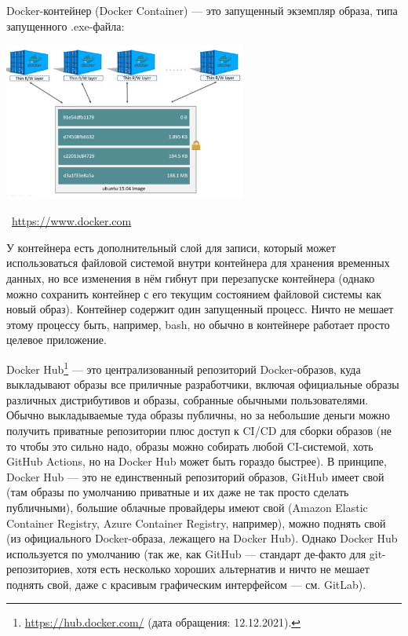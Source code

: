 \documentclass[a5paper]{article}
\newcommand{\attribution}[1] {
    \vspace{-5mm}\begin{flushright}\begin{scriptsize}\textcolor{gray}{\textcopyright\, #1}\end{scriptsize}\end{flushright}
}
\begin{document}
Docker-контейнер (Docker Container) --- это запущенный экземпляр образа, типа запущенного .exe-файла:

\begin{center}
    \includegraphics[width=0.6\textwidth]{dockerContainer.png}
    \attribution{\url{ https://www.docker.com}}
\end{center}

У контейнера есть дополнительный слой для записи, который может использоваться файловой системой внутри контейнера для хранения временных данных, но все изменения в нём гибнут при перезапуске контейнера (однако можно сохранить контейнер с его текущим состоянием файловой системы как новый образ). Контейнер содержит один запущенный процесс. Ничто не мешает этому процессу быть, например, bash, но обычно в контейнере работает просто целевое приложение.

Docker Hub\footnote{\url{https://hub.docker.com/} (дата обращения: 12.12.2021).} --- это централизованный репозиторий Docker-образов, куда выкладывают образы все приличные разработчики, включая официальные образы различных дистрибутивов и образы, собранные обычными пользователями. Обычно выкладываемые туда образы публичны, но за небольшие деньги можно получить приватные репозитории плюс доступ к CI/CD для сборки образов (не то чтобы это сильно надо, образы можно собирать любой CI-системой, хоть GitHub Actions, но на Docker Hub может быть гораздо быстрее). В принципе, Docker Hub --- это не единственный репозиторий образов, GitHub имеет свой (там образы по умолчанию приватные и их даже не так просто сделать публичными), большие облачные провайдеры имеют свой (Amazon Elastic Container Registry, Azure Container Registry, например), можно поднять свой (из официального Docker-образа, лежащего на Docker Hub). Однако Docker Hub используется по умолчанию (так же, как GitHub --- стандарт де-факто для git-репозиториев, хотя есть несколько хороших альтернатив и ничто не мешает поднять свой, даже с красивым графическим интерфейсом --- см. GitLab).
\end{document}
